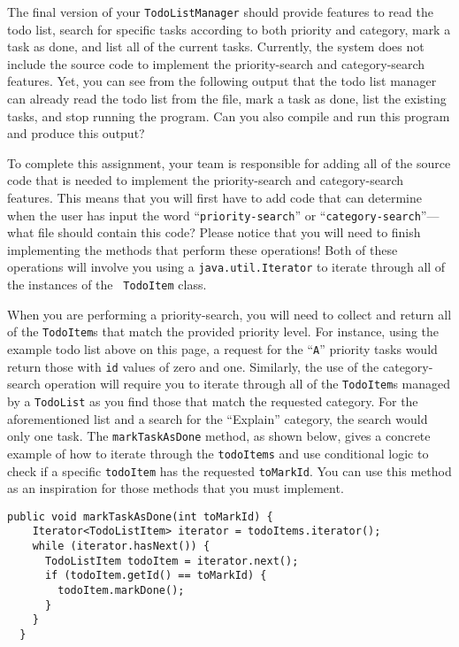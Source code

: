 \documentclass[11pt]{article}
\begin{document}
The final version of your {\tt TodoListManager} should provide features to read the todo list, search for specific tasks
according to both priority and category, mark a task as done, and list all of the current tasks. Currently, the system
does not include the source code to implement the priority-search and category-search features. Yet, you can see from
the following output that the todo list manager can already read the todo list from the file, mark a task as done, list
the existing tasks, and stop running the program. Can you also compile and run this program and produce this output?

To complete this assignment, your team is responsible for adding all of the source code that is needed to implement the
priority-search and category-search features. This means that you will first have to add code that can determine when
the user has input the word ``{\tt priority-search}'' or ``{\tt category-search}''---what file should contain this code?
Please notice that you will need to finish implementing the methods that perform these operations! Both of these
operations will involve you using a {\tt java.util.Iterator} to iterate through all of the instances of the {\tt
TodoItem} class.

When you are performing a priority-search, you will need to collect and return all of the {\tt TodoItem}s that match the
provided priority level. For instance, using the example todo list above on this page, a request for the ``{\tt A}''
priority tasks would return those with {\tt id} values of zero and one. Similarly, the use of the category-search
operation will require you to iterate through all of the {\tt TodoItem}s managed by a {\tt TodoList} as you find those
that match the requested category. For the aforementioned list and a search for the ``Explain'' category, the search
would only one task. The {\tt markTaskAsDone} method, as shown below, gives a concrete example of how to iterate through
the {\tt todoItems} and use conditional logic to check if a specific {\tt todoItem} has the requested {\tt toMarkId}.
You can use this method as an inspiration for those methods that you must implement.

\vspace{-0.1in}
\begin{verbatim}
public void markTaskAsDone(int toMarkId) {
    Iterator<TodoListItem> iterator = todoItems.iterator();
    while (iterator.hasNext()) {
      TodoListItem todoItem = iterator.next();
      if (todoItem.getId() == toMarkId) {
        todoItem.markDone();
      }
    }
  }
\end{verbatim}
\end{document}
